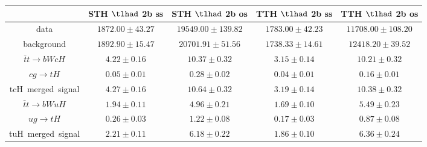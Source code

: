 \begin{table}
\begin{tabular}{|c|c|c|c|c|}
\end{tabular}
\begin{tabular}{|c|c|c|c|c|} \hline
 & STH $\tlhad$ 2b ss & STH $\tlhad$ 2b os & TTH $\tlhad$ 2b ss & TTH $\tlhad$ 2b os\\\hline
data & $1872.00\pm43.27$ & $19549.00\pm139.82$ & $1783.00\pm42.23$ & $11708.00\pm108.20$\\\hline
background & $1892.90\pm15.47$ & $20701.91\pm51.56$ & $1738.33\pm14.61$ & $12418.20\pm39.52$\\\hline
$\bar{t}t\to bWcH$ & $4.22\pm0.16$ & $10.37\pm0.32$ & $3.15\pm0.14$ & $10.21\pm0.32$\\\hline
$cg\to tH$ & $0.05\pm0.01$ & $0.28\pm0.02$ & $0.04\pm0.01$ & $0.16\pm0.01$\\\hline
tcH~merged~signal & $4.27\pm0.16$ & $10.64\pm0.32$ & $3.19\pm0.14$ & $10.38\pm0.32$\\\hline
$\bar{t}t\to bWuH$ & $1.94\pm0.11$ & $4.96\pm0.21$ & $1.69\pm0.10$ & $5.49\pm0.23$\\\hline
$ug\to tH$ & $0.26\pm0.03$ & $1.22\pm0.08$ & $0.17\pm0.03$ & $0.87\pm0.08$\\\hline
tuH~merged~signal & $2.21\pm0.11$ & $6.18\pm0.22$ & $1.86\pm0.10$ & $6.36\pm0.24$\\\hline
\end{tabular}
\label{tab:yield}
\end{table}

